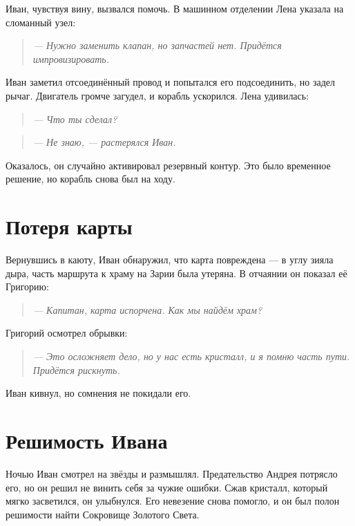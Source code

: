 \documentclass[12pt,a4paper]{book}
\newenvironment{dialogue}{\begin{quote}\itshape}{\end{quote}} %
\begin{document}
Иван, чувствуя вину, вызвался помочь. В машинном отделении Лена указала на сломанный узел:

\begin{dialogue}
--- Нужно заменить клапан, но запчастей нет. Придётся импровизировать.
\end{dialogue}

Иван заметил отсоединённый провод и попытался его подсоединить, но задел рычаг. Двигатель громче загудел, и корабль ускорился. Лена удивилась:

\begin{dialogue}
--- Что ты сделал?
\end{dialogue}

\begin{dialogue}
--- Не знаю, --- растерялся Иван.
\end{dialogue}

Оказалось, он случайно активировал резервный контур. Это было временное решение, но корабль снова был на ходу.

\section*{Потеря карты}

Вернувшись в каюту, Иван обнаружил, что карта повреждена --- в углу зияла дыра, часть маршрута к храму на Зарии была утеряна. В отчаянии он показал её Григорию:

\begin{dialogue}
--- Капитан, карта испорчена. Как мы найдём храм?
\end{dialogue}

Григорий осмотрел обрывки:

\begin{dialogue}
--- Это осложняет дело, но у нас есть кристалл, и я помню часть пути. Придётся рискнуть.
\end{dialogue}

Иван кивнул, но сомнения не покидали его.

\section*{Решимость Ивана}

Ночью Иван смотрел на звёзды и размышлял. Предательство Андрея потрясло его, но он решил не винить себя за чужие ошибки. Сжав кристалл, который мягко засветился, он улыбнулся. Его невезение снова помогло, и он был полон решимости найти Сокровище Золотого Света.
\end{document}
